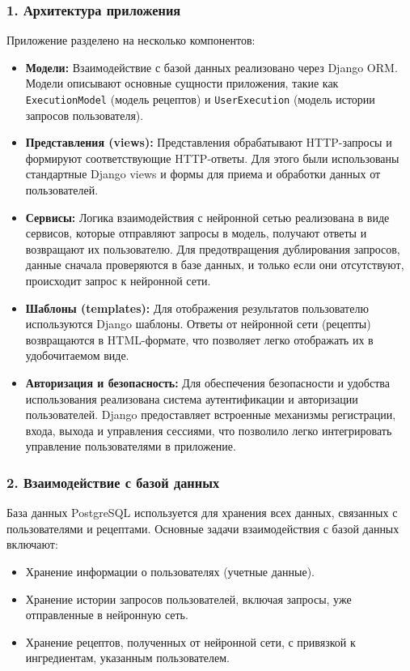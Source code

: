 {\subsubsection*{1. Архитектура приложения}
Приложение разделено на несколько компонентов:
\begin{itemize}
    \item \textbf{Модели:} Взаимодействие с базой данных реализовано через Django ORM. Модели описывают основные сущности приложения, такие как \texttt{ExecutionModel} (модель рецептов) и \texttt{UserExecution} (модель истории запросов пользователя).
    \item \textbf{Представления (views):} Представления обрабатывают HTTP-запросы и формируют соответствующие HTTP-ответы. Для этого были использованы стандартные Django views и формы для приема и обработки данных от пользователей.
    \item \textbf{Сервисы:} Логика взаимодействия с нейронной сетью реализована в виде сервисов, которые отправляют запросы в модель, получают ответы и возвращают их пользователю. Для предотвращения дублирования запросов, данные сначала проверяются в базе данных, и только если они отсутствуют, происходит запрос к нейронной сети.
    \item \textbf{Шаблоны (templates):} Для отображения результатов пользователю используются Django шаблоны. Ответы от нейронной сети (рецепты) возвращаются в HTML-формате, что позволяет легко отображать их в удобочитаемом виде.
    \item \textbf{Авторизация и безопасность:} Для обеспечения безопасности и удобства использования реализована система аутентификации и авторизации пользователей. Django предоставляет встроенные механизмы регистрации, входа, выхода и управления сессиями, что позволило легко интегрировать управление пользователями в приложение.
\end{itemize}

\subsubsection*{2. Взаимодействие с базой данных}
База данных PostgreSQL используется для хранения всех данных, связанных с пользователями и рецептами. Основные задачи взаимодействия с базой данных включают:
\begin{itemize}
    \item Хранение информации о пользователях (учетные данные).
    \item Хранение истории запросов пользователей, включая запросы, уже отправленные в нейронную сеть.
    \item Хранение рецептов, полученных от нейронной сети, с привязкой к ингредиентам, указанным пользователем.
\end{itemize}

}
